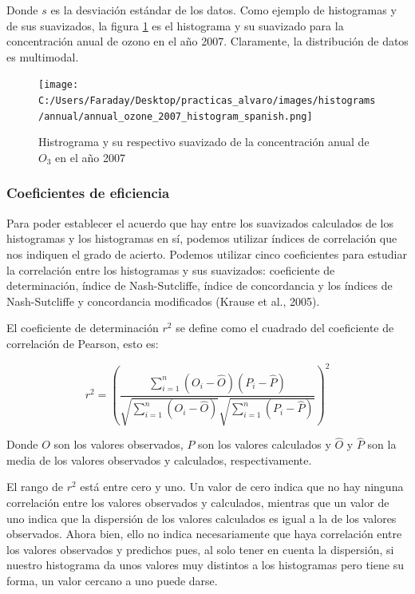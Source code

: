 \documentclass[12pt]{article}
\begin{document}
Donde $s$ es la desviación estándar de los datos. Como ejemplo de histogramas y de sus suavizados, la figura \ref{fig:hist-ejem-1} es el histograma y su suavizado para la concentración anual de ozono en el año 2007. Claramente, la distribución de datos es multimodal.

\begin{figure}[H]
\centering
\texttt{[image: C:/Users/Faraday/Desktop/practicas\_alvaro/images/histograms/annual/annual\_ozone\_2007\_histogram\_spanish.png]}
\caption{Histrograma y su respectivo suavizado de la concentración anual de $O_{3}$ en el año 2007}
\label{fig:hist-ejem-1}
\end{figure}

\subsubsection{Coeficientes de eficiencia}

Para poder establecer el acuerdo que hay entre los suavizados calculados de los histogramas y los histogramas en sí, podemos utilizar índices de correlación que nos indiquen el grado de acierto. Podemos utilizar cinco coeficientes para estudiar la correlación entre los histogramas y sus suavizados: coeficiente de determinación, índice de Nash-Sutcliffe, índice de concordancia y los índices de Nash-Sutcliffe y concordancia modificados (Krause et al., 2005).

El coeficiente de determinación $r^{2}$ se define como el cuadrado del coeficiente de correlación de Pearson, esto es:

\begin{equation}
r^{2} = \left(\frac{\sum^{n}_{i=1}(O_{i} - \hat{O})(P_{i} - \hat{P})}{\sqrt{\sum^{n}_{i=1}(O_{i} - \hat{O})} \sqrt{\sum^{n}_{i=1}(P_{i} - \hat{P})}} \right)^{2}
\label{eq:coeficiente_determinacion}
\end{equation}

Donde $O$ son los valores observados, $P$ son los valores calculados y $\hat{O}$ y $\hat{P}$ son la media de los valores observados y calculados, respectivamente.

El rango de $r^{2}$ está entre cero y uno. Un valor de cero indica que no hay ninguna correlación entre los valores observados y calculados, mientras que un valor de uno indica que la dispersión de los valores calculados es igual a la de los valores observados. Ahora bien, ello no indica necesariamente que haya correlación entre los valores observados y predichos pues, al solo tener en cuenta la dispersión, si nuestro histograma da unos valores muy distintos a los histogramas pero tiene su forma, un valor cercano a uno puede darse.
\end{document}
